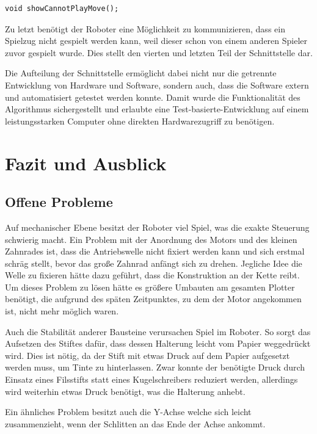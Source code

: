 \documentclass[conference,compsoc,final,a4paper]{IEEEtran}
\begin{document}
\begin{verbatim}
void showCannotPlayMove();
\end{verbatim}

Zu letzt benötigt der Roboter eine Möglichkeit zu kommunizieren, dass ein Spielzug nicht gespielt werden kann,
weil dieser schon von einem anderen Spieler zuvor gespielt wurde. Dies stellt den vierten und letzten Teil der
Schnittstelle dar.

Die Aufteilung der Schnittstelle ermöglicht dabei nicht nur die getrennte Entwicklung von Hardware und Software,
sondern auch, dass die Software extern und automatisiert getestet werden konnte. Damit wurde die Funktionalität des Algorithmus
sichergestellt und erlaubte eine Test-basierte-Entwicklung auf einem leistungsstarken Computer ohne direkten
Hardwarezugriff zu benötigen.

\section{Fazit und Ausblick}

\subsection{Offene Probleme}

Auf mechanischer Ebene besitzt der Roboter viel Spiel, was die exakte Steuerung schwierig macht. Ein Problem mit der Anordnung
des Motors und des kleinen Zahnrades ist, dass die
Antriebswelle nicht fixiert werden kann und sich erstmal schräg stellt, bevor das große Zahnrad anfängt sich zu drehen. Jegliche
Idee die Welle zu fixieren hätte dazu geführt, dass die Konstruktion an der Kette reibt. Um dieses Problem zu lösen hätte es größere
Umbauten am gesamten Plotter benötigt, die aufgrund des späten Zeitpunktes, zu dem der Motor angekommen ist, nicht mehr möglich waren.

Auch die Stabilität anderer Bausteine verursachen Spiel im Roboter. So sorgt das Aufsetzen des Stiftes dafür, dass dessen Halterung
leicht vom Papier weggedrückt wird. Dies ist nötig, da der Stift mit etwas Druck auf dem Papier aufgesetzt werden muss, um
Tinte zu hinterlassen. Zwar konnte der benötigte Druck durch Einsatz eines Filsstifts statt eines Kugelschreibers reduziert werden,
allerdings wird weiterhin etwas Druck benötigt, was die Halterung anhebt.

Ein ähnliches Problem besitzt auch die Y-Achse welche sich leicht zusammenzieht, wenn der Schlitten an das Ende der Achse ankommt.
\end{document}
